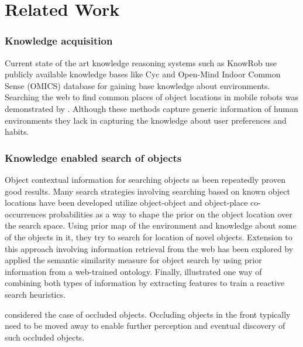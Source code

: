 \chapter{Related Work}



\subsection{Knowledge acquisition}
Current state of the art knowledge reasoning systems such as KnowRob \cite{c1} use publicly available knowledge bases like Cyc \cite{c2} and Open-Mind Indoor Common Sense (OMICS) database \cite{c3} for gaining base knowledge about environments.  Searching the web to find common places of object locations in mobile robots was demonstrated by \cite{c4}. Although these methods capture generic information of human environments they lack in capturing the knowledge about user preferences and habits. 



\subsection{Knowledge enabled search of objects}
\label{sub:partially known objects}
Object contextual information for searching objects as been repeatedly proven good results. Many search strategies involving searching based on known object locations have been developed
\cite{kollar_utilizing_2009} utilize object-object and object-place co-occurrences probabilities as a way to shape the prior on the object location over the search space. Using prior map of the environment and knowledge about some of the objects in it, they try to search for location of novel objects.
Extension to this approach involving information retrieval from the web has been explored by \cite {samadi_using_2012}
\cite{kunze_searching_2012} applied the semantic similarity measure for object search by using prior information from a web-trained ontology.
Finally, \cite{joho_learning_2011} illustrated one way of combining both types of information by extracting features to train a reactive search heuristics.

\cite{wong_using_2014} considered the case of occluded objects. Occluding objects in the front typically need to be moved away to enable further perception and eventual discovery of such occluded objects. 

